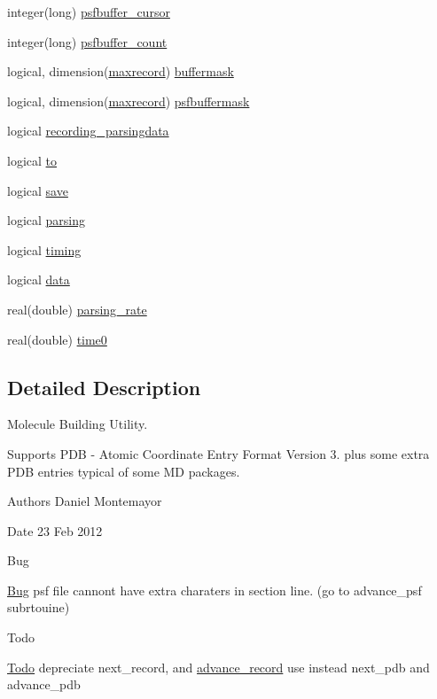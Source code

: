 \begin{DoxyCompactItemize}
\item 
integer(long) \hyperlink{namespacemolreader_ab080c636a2423beb139bdd65dcd884c3}{psfbuffer\+\_\+cursor}
\item 
integer(long) \hyperlink{namespacemolreader_af2dddaa7f6249a39287ffcdcbe2ce558}{psfbuffer\+\_\+count}
\item 
logical, dimension(\hyperlink{namespacemolreader_a7192fdfba4bcb0ee7504a9c6695c7106}{maxrecord}) \hyperlink{namespacemolreader_a3368bfc7f2d07a7f472a8118220516a9}{buffermask}
\item 
logical, dimension(\hyperlink{namespacemolreader_a7192fdfba4bcb0ee7504a9c6695c7106}{maxrecord}) \hyperlink{namespacemolreader_a747bd2c32990916c313506c805317e88}{psfbuffermask}
\item 
logical \hyperlink{namespacemolreader_a1f82d6f3302ab89b43d1fcbcba5d8fb2}{recording\+\_\+parsingdata}
\item 
logical \hyperlink{namespacemolreader_aec460f295b88cb8eb8dd58901edce0ba}{to}
\item 
logical \hyperlink{namespacemolreader_af3ae5caa4d00fa50c74d2f3154e8ea7c}{save}
\item 
logical \hyperlink{namespacemolreader_a151a8b8c33b86ab86d352aeaaf9ec84b}{parsing}
\item 
logical \hyperlink{namespacemolreader_a29899cd9778ac12af6bad404c1092518}{timing}
\item 
logical \hyperlink{namespacemolreader_ad29941441961d6bb225120cc88f93db7}{data}
\item 
real(double) \hyperlink{namespacemolreader_a5cf7dc5ccdeb068704a693ec6b248796}{parsing\+\_\+rate}
\item 
real(double) \hyperlink{namespacemolreader_ad5b1ed6898caa1c2161f0cdc6c10fc72}{time0}
\end{DoxyCompactItemize}


\subsection{Detailed Description}
Molecule Building Utility. 

Supports P\+DB -\/ Atomic Coordinate Entry Format Version 3. plus some extra P\+DB entries typical of some MD packages. \begin{DoxyAuthor}{Authors}
Daniel Montemayor 
\end{DoxyAuthor}
\begin{DoxyDate}{Date}
23 Feb 2012 
\end{DoxyDate}
\begin{DoxyRefDesc}{Bug}
\item[\hyperlink{bug__bug000001}{Bug}]psf file cannont have extra charaters in \textquotesingle{}section\textquotesingle{} line. (go to advance\+\_\+psf subrtouine) \end{DoxyRefDesc}
\begin{DoxyRefDesc}{Todo}
\item[\hyperlink{todo__todo000002}{Todo}]depreciate next\+\_\+record, and \hyperlink{interfacemolreader_1_1advance__record}{advance\+\_\+record} use instead next\+\_\+pdb and advance\+\_\+pdb \end{DoxyRefDesc}


